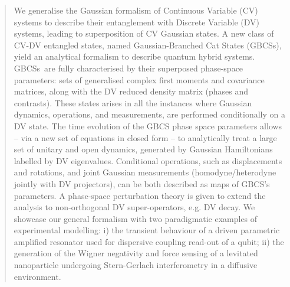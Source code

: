 \documentclass[%
reprint,
superscriptaddress,
nofootinbib,
 amsmath,amssymb,
prx,
floatfix,
]{revtex4-2}
\begin{document}
\date{\today}%
\begin{abstract}

We generalise the Gaussian formalism of Continuous Variable (CV) systems to describe their entanglement with Discrete Variable (DV) systems, leading to superposition of CV Gaussian states. A new class of CV-DV entangled states, named Gaussian-Branched Cat States (GBCSs), yield an analytical formalism to describe quantum hybrid systems. GBCSs~are fully characterised by their superposed phase-space parameters: sets of generalised complex first moments and covariance matrices, along with the DV reduced density matrix (phases and contrasts). These states arises in all the instances where Gaussian dynamics, operations, and measurements, are performed conditionally on a DV state. The time evolution of the GBCS phase space parameters allows --  via a new set of equations in closed form -- to analytically treat a large set of unitary and open dynamics, generated by Gaussian Hamiltonians labelled by DV eigenvalues. Conditional operations, such as displacements and rotations, and joint Gaussian measurements (homodyne/heterodyne jointly with DV projectors), can be both described as maps of GBCS's parameters. A phase-space perturbation theory is given to extend the analysis to non-orthogonal DV super-operators, e.g. DV decay. We showcase our general formalism with two paradigmatic examples of experimental modelling: i) the transient behaviour of a driven parametric amplified resonator used for dispersive coupling read-out of a qubit; ii) the generation of the Wigner negativity and force sensing of a levitated nanoparticle undergoing Stern-Gerlach interferometry in a diffusive environment.


\end{abstract}
\end{document}
